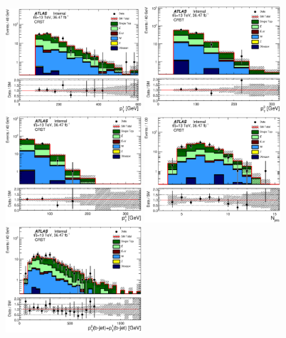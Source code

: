 \begin{figure}[htbp]
\begin{center}
\includegraphics[width=0.45\textwidth]{figures/singleTop/postfit/JetPt_1__CRST_log.eps}
\includegraphics[width=0.45\textwidth]{figures/singleTop/postfit/JetPt_3__CRST_log.eps}
\includegraphics[width=0.45\textwidth]{figures/singleTop/postfit/JetPt_4__CRST_log.eps}
\includegraphics[width=0.45\textwidth]{figures/singleTop/postfit/NJets_CRST_log.eps}
\includegraphics[width=0.45\textwidth]{figures/singleTop/postfit/JetPt_JetLeadTagIndex_JetPt_JetSubleadTagIndex__CRST_log.eps}


\end{center}
\end{figure}
